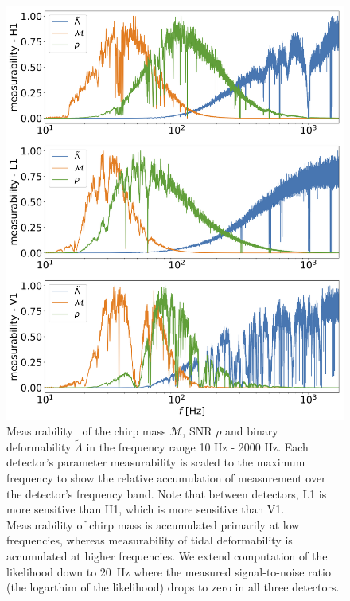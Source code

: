 \begin{figure}[t]
  \includegraphics[width=14cm]{figures/common_eos/measurability_plots.png}
  \caption{Measurability~\cite{Damour:2012yf} of the chirp mass $\mathcal{M}$, SNR $\rho$ and binary deformability $\tilde{\Lambda}$ in the frequency range 10 Hz - 2000 Hz. Each detector's parameter measurability is scaled to the maximum frequency to show the relative accumulation of measurement over the detector's frequency band. Note that between detectors, L1 is more sensitive than H1, which is more sensitive than V1. Measurability of chirp mass is accumulated primarily at low frequencies, whereas measurability of tidal deformability is accumulated at higher frequencies. We extend computation of the likelihood down to $20$~Hz where the measured signal-to-noise ratio (the logarthim of the likelihood) drops to zero in all three detectors. 
  \label{fig:measurability}}
\end{figure}

